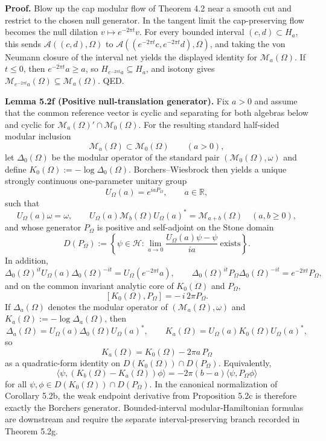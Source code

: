 \textbf{Proof.} Blow up the cap modular flow of Theorem 4.2 near a smooth cut and restrict to the chosen null generator. In the tangent limit the cap-preserving flow becomes the null dilation \(v\mapsto e^{-2\pi t}v\). For every bounded interval \((c,d)\subset H_a\), this sends \(\mathcal A((c,d),\Omega)\) to \(\mathcal A((e^{-2\pi t}c,e^{-2\pi t}d),\Omega)\), and taking the von Neumann closure of the interval net yields the displayed identity for \(\mathcal M_a(\Omega)\). If \(t\le 0\), then \(e^{-2\pi t}a\ge a\), so \(H_{e^{-2\pi t}a}\subseteq H_a\), and isotony gives \(\mathcal M_{e^{-2\pi t}a}(\Omega)\subseteq \mathcal M_a(\Omega)\). QED.

\textbf{Lemma 5.2f (Positive null-translation generator).} Fix \(a>0\) and assume that the common reference vector is cyclic and separating for both algebras below and cyclic for \(\mathcal M_a(\Omega)'\cap\mathcal M_0(\Omega)\).  For the resulting standard half-sided modular inclusion
\[
\mathcal M_a(\Omega)\subset \mathcal M_0(\Omega)
\qquad (a>0),
\]
let \(\Delta_0(\Omega)\) be the modular operator of the standard pair \((\mathcal M_0(\Omega),\omega)\) and define \(K_0(\Omega):=-\log \Delta_0(\Omega)\). Borchers--Wiesbrock then yields a unique strongly continuous one-parameter unitary group
\[
U_\Omega(a)=e^{iaP_\Omega},
\qquad a\in\mathbb R,
\]
such that
\[
U_\Omega(a)\omega=\omega,
\qquad
U_\Omega(a)\mathcal M_b(\Omega)U_\Omega(a)^*=\mathcal M_{a+b}(\Omega)
\quad (a,b\ge0),
\]
and whose generator \(P_\Omega\) is positive and self-adjoint on the Stone domain
\[
D(P_\Omega)
:=
\left\{
\psi\in\mathcal H:
\lim_{a\to0}\frac{U_\Omega(a)\psi-\psi}{ia}\ \text{exists}
\right\}.
\]
In addition,
\[
\Delta_0(\Omega)^{it}U_\Omega(a)\Delta_0(\Omega)^{-it}
=
U_\Omega(e^{-2\pi t}a),
\qquad
\Delta_0(\Omega)^{it}P_\Omega\Delta_0(\Omega)^{-it}
=
e^{-2\pi t}P_\Omega,
\]
and on the common invariant analytic core of \(K_0(\Omega)\) and \(P_\Omega\),
\[
[K_0(\Omega),P_\Omega]=-\,i\,2\pi P_\Omega.
\]
If \(\Delta_a(\Omega)\) denotes the modular operator of \((\mathcal M_a(\Omega),\omega)\) and \(K_a(\Omega):=-\log \Delta_a(\Omega)\), then
\[
\Delta_a(\Omega)=U_\Omega(a)\Delta_0(\Omega)U_\Omega(a)^*,
\qquad
K_a(\Omega)=U_\Omega(a)K_0(\Omega)U_\Omega(a)^*,
\]
so
\[
K_a(\Omega)=K_0(\Omega)-2\pi a\,P_\Omega
\]
as a quadratic-form identity on \(D(K_0(\Omega))\cap D(P_\Omega)\). Equivalently,
\[
\langle\psi,(K_b(\Omega)-K_a(\Omega))\phi\rangle
=
-2\pi(b-a)\langle\psi,P_\Omega\phi\rangle
\]
for all \(\psi,\phi\in D(K_0(\Omega))\cap D(P_\Omega)\). In the canonical normalization of Corollary 5.2b, the weak endpoint derivative from Proposition 5.2c is therefore exactly the Borchers generator. Bounded-interval modular-Hamiltonian formulas are downstream and require the separate interval-preserving branch recorded in Theorem 5.2g.

